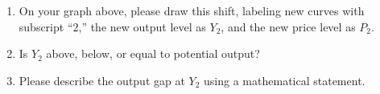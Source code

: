 \documentclass[
    letterpaper,paper=portrait,fleqn,
    DIV=16,fontsize=12pt,twoside=semi,
    parskip=full-,
    headings=standardclasses]
{scrartcl}
\begin{document}
\begin{enumerate}
\vspace{4.0\baselineskip}

\item On your graph above, please draw this shift, labeling new curves with subscript ``2,'' the new output level as $Y_2$, and the new price level as $P_2$.

\item Is $Y_2$ above, below, or equal to potential output?

\vspace{3.0\baselineskip}

\item Please describe the output gap at $Y_2$ using a mathematical statement.

\vspace{2.0\baselineskip}

\end{enumerate}
\end{document}
